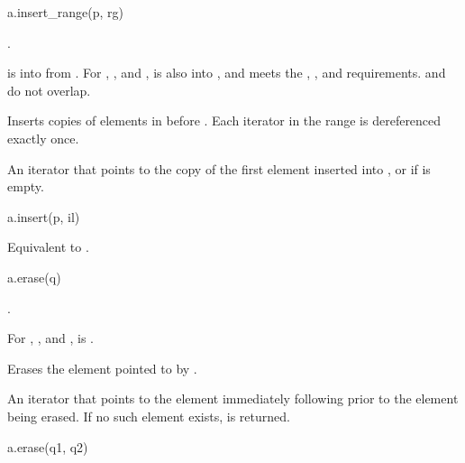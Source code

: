 %
\begin{itemdecl}
a.insert_range(p, rg)
\end{itemdecl}

\begin{itemdescr}
\pnum
\result
{}.

\pnum
\expects
{} is  into 
from .
For , , and ,
 is also
 into ,
and  meets the
,
, and
 requirements.
 and  do not overlap.

\pnum
\effects
Inserts copies of elements in  before .
Each iterator in the range  is dereferenced exactly once.

\pnum
\returns
An iterator
that points to the copy of the first element inserted into , or
 if  is empty.
\end{itemdescr}

\begin{itemdecl}
a.insert(p, il)
\end{itemdecl}

\begin{itemdescr}
\pnum
\effects
Equivalent to .
\end{itemdescr}

%
\begin{itemdecl}
a.erase(q)
\end{itemdecl}

\begin{itemdescr}
\pnum
\result
{}.

\pnum
\expects
For , , and ,
 is .

\pnum
\effects
Erases the element pointed to by .

\pnum
\returns
An iterator that points to the element immediately following 
prior to the element being erased.
If no such element exists,  is returned.
\end{itemdescr}

\begin{itemdecl}
a.erase(q1, q2)
\end{itemdecl}

